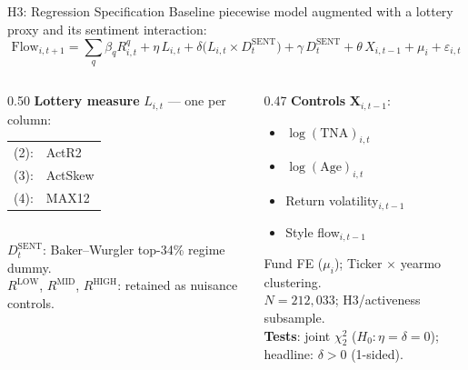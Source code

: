 \documentclass[10pt, aspectratio=169]{beamer}
\begin{document}
\begin{frame}{H3: Regression Specification}
  \small Baseline piecewise model augmented with a lottery proxy and its sentiment interaction:
  \vspace{-2pt}
  \[
    \text{Flow}_{i,t+1} = \sum_q \beta_q R^q_{i,t}
    + \eta\, L_{i,t}
    + \delta \bigl(L_{i,t} \times D^{\text{SENT}}_t\bigr)
    + \gamma\, D^{\text{SENT}}_t
    + \theta\,X_{i,t-1}
    + \mu_i + \varepsilon_{i,t}
  \]
  \vspace{-2pt}
  \begin{columns}[T]
    \begin{column}{0.50\textwidth}
      \footnotesize\textbf{Lottery measure} $L_{i,t}$ — one per column:
      \vspace{2pt}\\
      \begin{tabular}{@{}ll@{}}
        (2): & ActR2\\
        (3): & ActSkew\\
        (4): & MAX12\\
      \end{tabular}\\[5pt]
      $D^{\text{SENT}}_t$: Baker--Wurgler top-34\% regime dummy.\\
      $R^{\text{LOW}}$, $R^{\text{MID}}$, $R^{\text{HIGH}}$: retained as nuisance controls.
    \end{column}
    \begin{column}{0.47\textwidth}
      \footnotesize\textbf{Controls} $\mathbf{X}_{i,t-1}$:
      \begin{itemize}\itemsep1pt
        \item $\log(\text{TNA})_{i,t}$
        \item $\log(\text{Age})_{i,t}$
        \item Return volatility$_{i,t-1}$
        \item Style flow$_{i,t-1}$
      \end{itemize}
      \vspace{3pt}
      Fund FE ($\mu_i$); Ticker $\times$ yearmo clustering.\\
      $N=212{,}033$; H3/activeness subsample.\\[4pt]
      \textbf{Tests}: joint $\chi^2_2$ ($H_0: \eta=\delta=0$);\\
      headline: $\delta > 0$ (1-sided).
    \end{column}
  \end{columns}
\end{frame}
\end{document}
